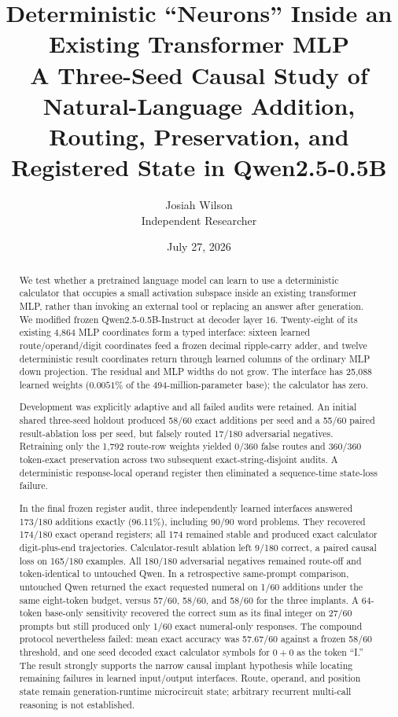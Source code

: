 \documentclass[11pt]{article}
\title{\textbf{Deterministic ``Neurons'' Inside an Existing Transformer MLP}\\
\large A Three-Seed Causal Study of Natural-Language Addition,
Routing, Preservation, and Registered State in Qwen2.5-0.5B}
\author{Josiah Wilson\\Independent Researcher}
\date{July 27, 2026}
\begin{document}
\maketitle

\begin{abstract}
We test whether a pretrained language model can learn to use a deterministic
calculator that occupies a small activation subspace inside an existing
transformer MLP, rather than invoking an external tool or replacing an answer
after generation. We modified frozen Qwen2.5-0.5B-Instruct at decoder layer 16.
Twenty-eight of its existing 4,864 MLP coordinates form a typed interface:
sixteen learned route/operand/digit coordinates feed a frozen decimal
ripple-carry adder, and twelve deterministic result coordinates return through
learned columns of the ordinary MLP down projection. The residual and MLP
widths do not grow. The interface has 25,088 learned weights
($0.0051\%$ of the 494-million-parameter base); the calculator has zero.

Development was explicitly adaptive and all failed audits were retained. An
initial shared three-seed holdout produced 58/60 exact additions per seed and
a 55/60 paired result-ablation loss per seed, but falsely routed 17/180
adversarial negatives. Retraining only the 1,792 route-row weights yielded
0/360 false routes and 360/360 token-exact preservation across two subsequent
exact-string-disjoint audits. A deterministic response-local operand register
then eliminated a sequence-time state-loss failure.

In the final frozen register audit, three independently learned interfaces
answered 173/180 additions exactly (96.11\%), including 90/90 word problems.
They recovered 174/180 exact operand registers; all 174 remained stable and
produced exact calculator digit-plus-end trajectories. Calculator-result
ablation left 9/180 correct, a paired causal loss on 165/180 examples. All
180/180 adversarial negatives remained route-off and token-identical to
untouched Qwen. In a retrospective same-prompt comparison, untouched Qwen
returned the exact requested numeral on 1/60 additions under the same
eight-token budget, versus 57/60, 58/60, and 58/60 for the three implants. A
64-token base-only sensitivity recovered the correct sum as its final integer
on 27/60 prompts but still produced only 1/60 exact numeral-only responses.
The compound protocol nevertheless failed: mean exact accuracy was 57.67/60
against a frozen 58/60 threshold, and one seed decoded exact calculator symbols
for $0+0$ as the token ``I.'' The result strongly supports the narrow causal
implant hypothesis while locating remaining failures in learned input/output
interfaces. Route, operand, and position state remain generation-runtime
microcircuit state; arbitrary recurrent multi-call reasoning is not established.
\end{abstract}
\end{document}
